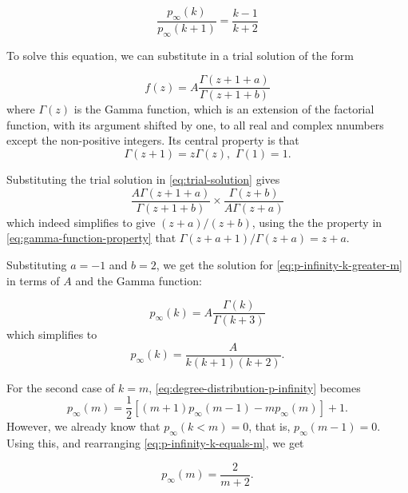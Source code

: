 \begin{equation}
	\frac{p_{\infty}(k)}{p_{\infty}(k+1)} = \frac{k-1}{k+2}
	\label{eq:p-infinity-k-greater-m}	
\end{equation}

To solve this equation, we can substitute in a trial solution of the form

\begin{equation}
	f(z) = A \frac{\Gamma(z+1+a)}{\Gamma(z+1+b)}
	\label{eq:trial-solution}
\end{equation}
where $\Gamma(z)$ is the Gamma function, which is an extension of the factorial function, with its argument shifted by one, to all real and complex nnumbers except the non-positive integers. Its central property is that
\begin{equation}
	\Gamma(z+1) = z \Gamma(z),\,\, \Gamma(1) = 1.
	\label{eq:gamma-function-property}
\end{equation}

Substituting the trial solution in \autoref{eq:trial-solution} gives
\begin{equation}
	\frac{A \Gamma(z+1+a)}{\Gamma(z+1+b)} \times \frac{\Gamma(z+b)}{A \Gamma(z+a)}
\end{equation}
which indeed simplifies to give $(z+a) / (z+b)$, using the the property in \autoref{eq:gamma-function-property} that $\Gamma(z+a+1) / \Gamma(z+a) = z+a$. 

Substituting $a = -1$ and $b=2$, we get the solution for \autoref{eq:p-infinity-k-greater-m} in terms of $A$ and the Gamma function:

\begin{equation}
	p_{\infty}(k) = A \frac{\Gamma(k)}{\Gamma(k+3)}
\end{equation}
which simplifies to 
\begin{equation}
	p_{\infty}(k) = \frac{A}{k(k+1)(k+2)}.
	\label{eq:p-infinity-solution-unknown-A}
\end{equation}

For the second case of $k = m$, \autoref{eq:degree-distribution-p-infinity} becomes 
\begin{equation}
	p_{\infty}(m) = \frac{1}{2}[(m+1)p_{\infty}(m-1) - mp_{\infty}(m)] + 1. 
	\label{eq:p-infinity-k-equals-m}
\end{equation}
However, we already know that $p_{\infty}(k < m) = 0$, that is, $p_{\infty}(m-1) = 0$. Using this, and rearranging \autoref{eq:p-infinity-k-equals-m}, we get 

\begin{equation}
	p_{\infty}(m) = \frac{2}{m+2}.
	\label{p-infinity-normalization}
\end{equation}

